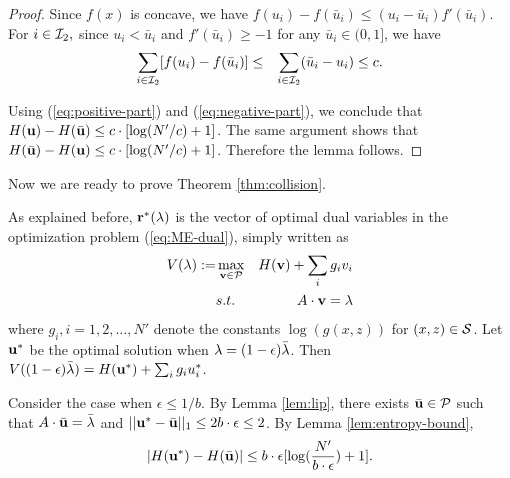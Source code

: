 \documentclass{IEEEtran}
\begin{document}
\begin{proof}
Since $f(x)$ is concave, we have $f(u_{i})-f(\bar{u}_{i})\le(u_{i}-\bar{u}_{i})f'(\bar{u}_{i})$.
For $i\in{\cal I}_{2},$ since $u_{i}<\bar{u}_{i}$ and $f'(\bar{u}_{i})\ge-1$
for any $\bar{u}_{i}\in(0,1]$, we have \begin{eqnarray}
\sum_{i\in{\cal I}_{2}}[f(u_{i})-f(\bar{u}_{i})] & \le & \sum_{i\in{\cal I}_{2}}(\bar{u}_{i}-u_{i})\le c.\label{eq:negative-part}\end{eqnarray}


Using (\ref{eq:positive-part}) and (\ref{eq:negative-part}), we
conclude that $H({\bf u})-H(\bar{{\bf u}})\le c\cdot[\log(N'/c)+1]$.
The same argument shows that $H(\bar{{\bf u}})-H({\bf u})\le c\cdot[\log(N'/c)+1]$.
Therefore the lemma follows.
\end{proof}
Now we are ready to prove Theorem \ref{thm:collision}.

As explained before, ${\bf r}^{*}({\bf \lambda})$ is the vector of
optimal dual variables in the optimization problem (\ref{eq:ME-dual}),
simply written as\begin{eqnarray}
V({\bf \lambda}):= & \max_{{\bf v}\in{\cal P}} & H({\bf v})+\sum_{i}g_{i}v_{i}\nonumber \\
 & s.t. & A\cdot{\bf v}={\bf \lambda}\label{eq:max-entropy}\end{eqnarray}
where $g_{i},i=1,2,\dots,N'$ denote the constants $\log(g(x,z))$
for $(x,z)\in{\cal S}$. Let ${\bf u}^{*}$ be the optimal solution
when ${\bf \lambda}=(1-\epsilon)\bar{{\bf \lambda}}$. Then $V((1-\epsilon)\bar{{\bf \lambda}})=H({\bf u}^{*})+\sum_{i}g_{i}u_{i}^{*}$. 

Consider the case when $\epsilon\le1/b$. By Lemma \ref{lem:lip},
there exists $\bar{{\bf u}}\in{\cal P}$ such that $A\cdot\bar{{\bf u}}=\bar{{\bf \lambda}}$
and $||{\bf u}^{*}-\bar{{\bf u}}||_{1}\le2b\cdot\epsilon\le2$. By
Lemma \ref{lem:entropy-bound}, \begin{equation}
|H({\bf u}^{*})-H(\bar{{\bf u}})|\le b\cdot\epsilon[\log(\frac{N'}{b\cdot\epsilon})+1].\label{eq:ineq3}\end{equation}
\end{document}
